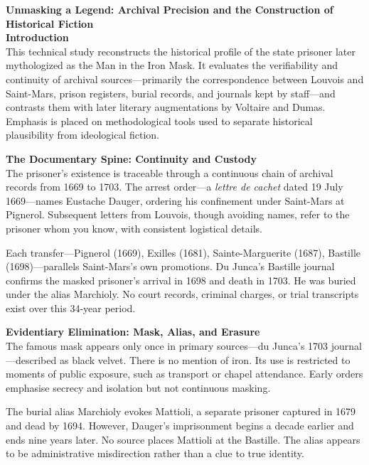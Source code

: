 \begin{technical}
    {\Large\textbf{Unmasking a Legend: Archival Precision and the Construction of Historical Fiction}}\\[0.7em]
    
    \textbf{Introduction}\\[0.5em]
    This technical study reconstructs the historical profile of the state prisoner later mythologized as \QSOpen{}the Man in the Iron Mask.\QSClose{} It evaluates the verifiability and continuity of archival sources—primarily the correspondence between Louvois and Saint-Mars, prison registers, burial records, and journals kept by staff—and contrasts them with later literary augmentations by Voltaire and Dumas. Emphasis is placed on methodological tools used to separate historical plausibility from ideological fiction.
    
    \textbf{The Documentary Spine: Continuity and Custody}\\[0.5em]
    The prisoner’s existence is traceable through a continuous chain of archival records from 1669 to 1703. The arrest order—a \textit{lettre de cachet} dated 19 July 1669—names \QSOpen{}Eustache Dauger,\QSClose{} ordering his confinement under Saint-Mars at Pignerol. Subsequent letters from Louvois, though avoiding names, refer to \QSOpen{}the prisoner whom you know,\QSClose{} with consistent logistical details.
    
    Each transfer—Pignerol (1669), Exilles (1681), Sainte-Marguerite (1687), Bastille (1698)—parallels Saint-Mars’s own promotions. Du Junca’s Bastille journal confirms the masked prisoner’s arrival in 1698 and death in 1703. He was buried under the alias \QSOpen{}Marchioly.\QSClose{} No court records, criminal charges, or trial transcripts exist over this 34-year period.
    
    \textbf{Evidentiary Elimination: Mask, Alias, and Erasure}\\[0.5em]
    The famous mask appears only once in primary sources—du Junca’s 1703 journal—described as \QSOpen{}black velvet.\QSClose{} There is no mention of iron. Its use is restricted to moments of public exposure, such as transport or chapel attendance. Early orders emphasise secrecy and isolation but not continuous masking.
    
    The burial alias \QSOpen{}Marchioly\QSClose{} evokes \QSOpen{}Mattioli,\QSClose{} a separate prisoner captured in 1679 and dead by 1694. However, Dauger’s imprisonment begins a decade earlier and ends nine years later. No source places Mattioli at the Bastille. The alias appears to be administrative misdirection rather than a clue to true identity.
    

\end{technical}
